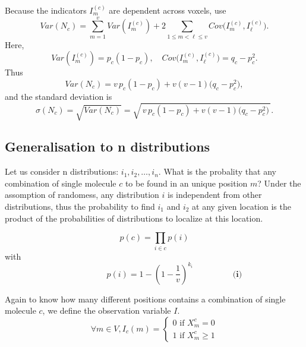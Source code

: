 \documentclass{article}
\begin{document}
Because the indicators \(I^{(c)}_m\) are dependent across voxels, use
\[
Var(N_c)
= \sum_{m=1}^v Var(I^{(c)}_m)
  + 2\sum_{1\le m<\ell\le v} Cov\bigl(I^{(c)}_m, I^{(c)}_\ell\bigr).
\]
Here,
\[
Var(I^{(c)}_m) = p_c(1-p_c),
\quad
Cov\bigl(I^{(c)}_m, I^{(c)}_\ell\bigr) = q_c - p_c^2.
\]
Thus
\[
Var(N_c)
= v\,p_c(1-p_c)
  + v(v-1)\bigl(q_c - p_c^2\bigr),
\]
and the standard deviation is
\[
\sigma(N_c)
= \sqrt{Var(N_c)} 
= \sqrt{\,v\,p_c(1-p_c) + v(v-1)\bigl(q_c - p_c^2\bigr)\,}.
\]


\newpage
\subsection{Generalisation to n distributions}

Let us consider n distributions: $i_1, i_2, \ldots, i_n$. What is the probality that any combination of single molecule $c$ to be found in an unique position $m$?
Under the assomption of randomess, any distribution $i$ is independent from other distributions, thus the probability to find $i_1$ and $i_2$ at any given
location is the product of the probabilities of distributions to localize at this location.

\[
p(c) = \prod_{i \in c}p(i)
\]
with 
\begin{equation}
\hspace{2cm} p(i) = 1-{(1-\frac{1}{v})}^{k_i} \hspace{2cm} \textbf{(i)}
\end{equation}

Again to know how many different positions contains a combination of single molecule $c$, we define the observation variable $I$.
\[
\forall m \in V, I_c(m) = \begin{cases}
    0 \text{ if } X^c_m = 0 \\
    1 \text{ if } X^c_m \geq 1
\end{cases}
\]



\begin{figure}[h]
\centering
\end{figure}
\end{document}
